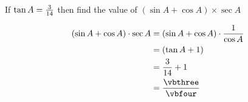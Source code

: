 


\FRACADD\vbone{}\vbthree\vbfour

\question[1]  If $\tan A = \frac{3}{14}$ then find the value of
$(\sin A + \cos A)\times\sec A$

\watchout
{}

\ifprintanswers
\fi 

\begin{solution}[\mcq]
	\begin{align}
		(\sin A + \cos A)\cdot\sec A &= (\sin A + \cos A)\cdot\dfrac{1}{\cos A} \\
		                             &= (\tan A + 1) \\
		                             &= \dfrac\vbone\vbtwo + 1 \\
		                             &= \dfrac\vbthree\vbfour
	\end{align}
\end{solution}
